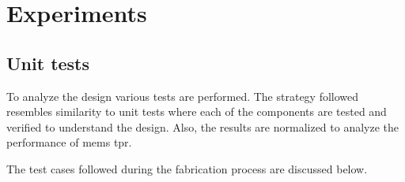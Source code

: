 \documentclass[../report.tex]{subfiles}
\begin{document}
	
\chapter{Experiments}

	\section{Unit tests}
	To analyze the design various tests are performed. The strategy followed resembles similarity to unit tests where each of the components are tested and verified to understand the design. Also, the results are normalized to analyze the performance of \gls{mems} \gls{tpr}. 
	
	\noindent The test cases followed during the fabrication process are discussed below. 
\end{document}
